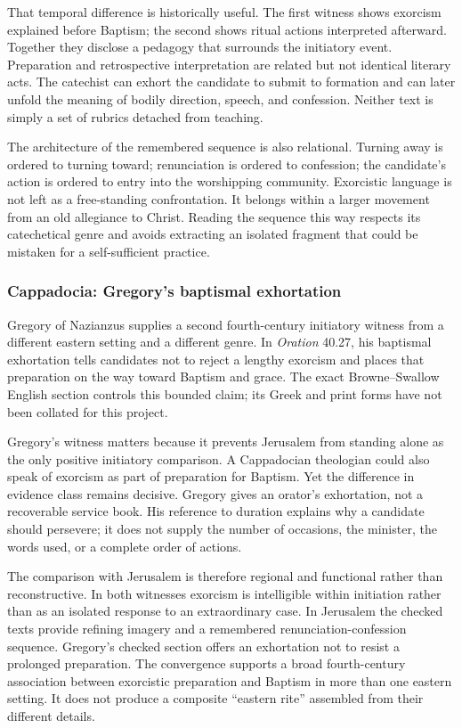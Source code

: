 That temporal difference is historically useful. The first witness shows
exorcism explained before Baptism; the second shows ritual actions interpreted
afterward. Together they disclose a pedagogy that surrounds the initiatory
event. Preparation and retrospective interpretation are related but not
identical literary acts. The catechist can exhort the candidate to submit to
formation and can later unfold the meaning of bodily direction, speech, and
confession. Neither text is simply a set of rubrics detached from teaching.

The architecture of the remembered sequence is also relational. Turning away
is ordered to turning toward; renunciation is ordered to confession; the
candidate's action is ordered to entry into the worshipping community.
Exorcistic language is not left as a free-standing confrontation. It belongs
within a larger movement from an old allegiance to Christ. Reading the
sequence this way respects its catechetical genre and avoids extracting an
isolated fragment that could be mistaken for a self-sufficient practice.

\subsubsection{Cappadocia: Gregory's baptismal exhortation}

Gregory of Nazianzus supplies a second fourth-century initiatory witness from
a different eastern setting and a different genre. In \emph{Oration} 40.27,
his baptismal exhortation tells candidates not to reject a lengthy exorcism
and places that preparation on the way toward Baptism and grace. The exact
Browne--Swallow English section controls this bounded claim; its Greek and
print forms have not been collated for this project.

Gregory's witness matters because it prevents Jerusalem from standing alone
as the only positive initiatory comparison. A Cappadocian theologian could
also speak of exorcism as part of preparation for Baptism. Yet the difference
in evidence class remains decisive. Gregory gives an orator's exhortation,
not a recoverable service book. His reference to duration explains why a
candidate should persevere; it does not supply the number of occasions, the
minister, the words used, or a complete order of actions.

The comparison with Jerusalem is therefore regional and functional rather
than reconstructive. In both witnesses exorcism is intelligible within
initiation rather than as an isolated response to an extraordinary case. In
Jerusalem the checked texts provide refining imagery and a remembered
renunciation-confession sequence. Gregory's checked section offers an
exhortation not to resist a prolonged preparation. The convergence supports
a broad fourth-century association between exorcistic preparation and
Baptism in more than one eastern setting. It does not produce a composite
``eastern rite'' assembled from their different details.

